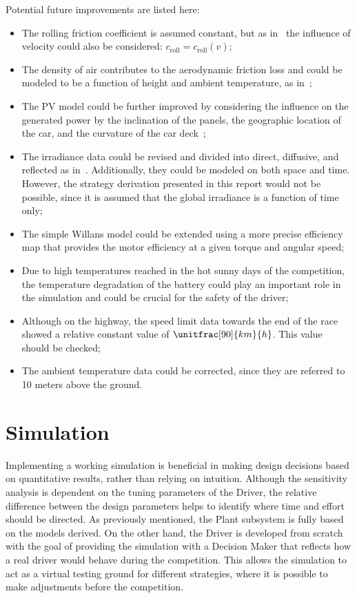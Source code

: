 Potential future improvements are listed here:
\begin{itemize}
	\item The rolling friction coefficient is assumed constant, but as in~\cite{winningSolarCar2003book, SolUTra:2006mt} the influence of velocity could also be considered: $c_\mathrm{roll} = c_\mathrm{roll}(v)$;
	\item The density of air contributes to the aerodynamic friction loss and could be modeled to be a function of height and ambient temperature, as in~\cite{SolUTra:2006mt};
	\item The PV model could be further improved by considering the influence on the generated power by the inclination of the panels, the geographic location of the car, and the curvature of the car deck~\cite{optimalEnergyManagement:2000book};
	\item The irradiance data could be revised and divided into direct, diffusive, and reflected as in~\cite{optimalEnergyManagement:2000book}. Additionally, they could be modeled on both space and time. However, the strategy derivation presented in this report would not be possible, since it is assumed that the global irradiance is a function of time only;
	\item The simple Willans model could be extended using a more precise efficiency map that provides the motor efficiency at a given torque and angular speed;
	\item Due to high temperatures reached in the hot sunny days of the competition, the temperature degradation of the battery could play an important role in the simulation and could be crucial for the safety of the driver;
	\item Although on the highway, the speed limit data towards the end of the race showed a relative constant value of $\unitfrac[90]{km}{h}$. This value should be checked;
	\item The ambient temperature data could be corrected, since they are referred to 10 meters above the ground.
\end{itemize}


\section{Simulation}
Implementing a working simulation is beneficial in making design decisions based on quantitative results, rather than relying on intuition. Although the sensitivity analysis is dependent on the tuning parameters of the Driver, the relative difference between the design parameters helps to identify where time and effort should be directed. As previously mentioned, the Plant subsystem is fully based on the models derived. On the other hand, the Driver is developed from scratch with the goal of providing the simulation with a Decision Maker that reflects how a real driver would behave during the competition. This allows the simulation to act as a virtual testing ground for different strategies, where it is possible to make adjustments before the competition. 

